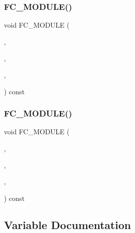 \subsubsection{\texorpdfstring{F\+C\+\_\+\+M\+O\+D\+U\+L\+E()}{FC\_MODULE()}\hspace{0.1cm}{\footnotesize\ttfamily [5/6]}}
{\footnotesize\ttfamily void F\+C\+\_\+\+M\+O\+D\+U\+LE (\begin{DoxyParamCaption}\item[{navierstokesrhsweno}]{,  }\item[{ns\+\_\+rhs\+\_\+axisymmetric}]{,  }\item[{N\+A\+V\+I\+E\+R\+S\+T\+O\+K\+E\+S\+R\+H\+S\+W\+E\+NO}]{,  }\item[{N\+S\+\_\+\+R\+H\+S\+\_\+\+A\+X\+I\+S\+Y\+M\+M\+E\+T\+R\+IC}]{ }\end{DoxyParamCaption}) const}

\hypertarget{WENOKernels_8H_af6795ebf410b27f3d5a4249f7fa73edc}{}\label{WENOKernels_8H_af6795ebf410b27f3d5a4249f7fa73edc} 
\subsubsection{\texorpdfstring{F\+C\+\_\+\+M\+O\+D\+U\+L\+E()}{FC\_MODULE()}\hspace{0.1cm}{\footnotesize\ttfamily [6/6]}}
{\footnotesize\ttfamily void F\+C\+\_\+\+M\+O\+D\+U\+LE (\begin{DoxyParamCaption}\item[{navierstokesrhsweno}]{,  }\item[{ns\+\_\+rhs\+\_\+axisymmetric\+\_\+axis}]{,  }\item[{N\+A\+V\+I\+E\+R\+S\+T\+O\+K\+E\+S\+R\+H\+S\+W\+E\+NO}]{,  }\item[{N\+S\+\_\+\+R\+H\+S\+\_\+\+A\+X\+I\+S\+Y\+M\+M\+E\+T\+R\+I\+C\+\_\+\+A\+X\+IS}]{ }\end{DoxyParamCaption}) const}



\subsection{Variable Documentation}
\hypertarget{WENOKernels_8H_a63e6aad5d271e5b535685e684cb4a11b}{}\label{WENOKernels_8H_a63e6aad5d271e5b535685e684cb4a11b} 
